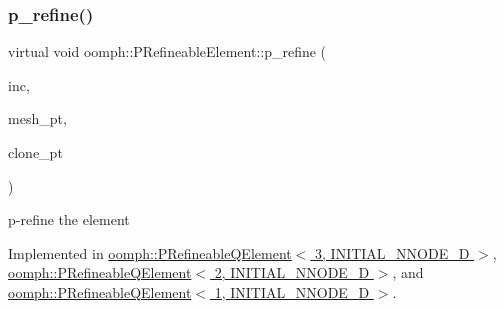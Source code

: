 \mbox{\label{classoomph_1_1PRefineableElement_a706db9352965197a215405f620b3cedc}} 
\subsubsection{\texorpdfstring{p\+\_\+refine()}{p\_refine()}}
{\footnotesize\ttfamily virtual void oomph\+::\+P\+Refineable\+Element\+::p\+\_\+refine (\begin{DoxyParamCaption}\item[{const int \&}]{inc,  }\item[{\hyperlink{classoomph_1_1Mesh}{Mesh} $\ast$const \&}]{mesh\+\_\+pt,  }\item[{\hyperlink{classoomph_1_1GeneralisedElement}{Generalised\+Element} $\ast$const \&}]{clone\+\_\+pt }\end{DoxyParamCaption})\hspace{0.3cm}{\ttfamily [pure virtual]}}



p-\/refine the element 



Implemented in \hyperlink{classoomph_1_1PRefineableQElement_3_013_00_01INITIAL__NNODE__1D_01_4_a27dcd49d1188203b52a0c482a5466ba6}{oomph\+::\+P\+Refineable\+Q\+Element$<$ 3, I\+N\+I\+T\+I\+A\+L\+\_\+\+N\+N\+O\+D\+E\+\_\+D $>$}, \hyperlink{classoomph_1_1PRefineableQElement_3_012_00_01INITIAL__NNODE__1D_01_4_aa74bd994a95736da7c0c92297959b026}{oomph\+::\+P\+Refineable\+Q\+Element$<$ 2, I\+N\+I\+T\+I\+A\+L\+\_\+\+N\+N\+O\+D\+E\+\_\+D $>$}, and \hyperlink{classoomph_1_1PRefineableQElement_3_011_00_01INITIAL__NNODE__1D_01_4_ab3210a40d15dd21dd3befee2220eca95}{oomph\+::\+P\+Refineable\+Q\+Element$<$ 1, I\+N\+I\+T\+I\+A\+L\+\_\+\+N\+N\+O\+D\+E\+\_\+D $>$}.

\mbox{\label{classoomph_1_1PRefineableElement_a086636c6717bb5bbe7e31123bc0cd511}} 
